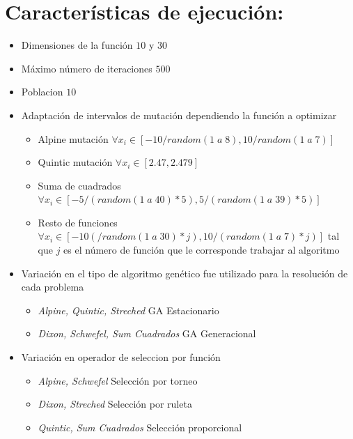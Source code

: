\documentclass[10pt]{article}
\begin{document}
\section{Características de ejecución:}
\begin{itemize}
  \item Dimensiones de la función $10$ y $30$
  \item Máximo número de iteraciones $500$
  \item Poblacion $10$
  \item Adaptación de intervalos de mutación dependiendo la función a optimizar
  \begin{itemize}
    \item Alpine mutación $\forall x_{i}\in[-10/random(1\;a\;8),10/random(1\;a\;7)]$
    \item Quintic mutación $\forall x_{i}\in[2.47,2.479]$
    \item Suma de cuadrados $\forall x_{i}\in[-5/(random(1\;a\;40)*5),5/(random(1\;a\;39)*5)]$
    \item Resto de funciones $\forall x_{i}\in[-10(/random(1\;a\;30)*j),10/(random(1\;a\;7)*j)]$ tal que $j$ es el número de función que le corresponde trabajar al algoritmo
  \end{itemize}
  \item Variación en el tipo de algoritmo genético fue utilizado para la resolución de cada problema
  \begin{itemize}
    \item \textit{Alpine, Quintic, Streched }GA Estacionario
    \item \textit{Dixon, Schwefel, Sum Cuadrados} GA Generacional
  \end{itemize}
  \item Variación en operador de seleccion por función
  \begin{itemize}
    \item \textit{Alpine, Schwefel} Selección por torneo
    \item \textit{Dixon, Streched} Selección por ruleta
    \item \textit{Quintic, Sum Cuadrados} Selección proporcional
  \end{itemize}
\end{itemize}
\end{document}
